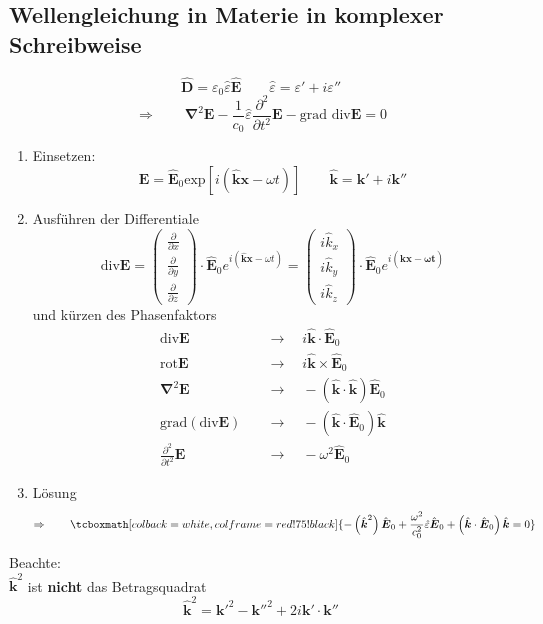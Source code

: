 \documentclass[titlepage,11pt,a4paper,ngerman]{report}
\newcommand{\tx}[1]{\textrm{#1}}
\newcommand{\prt}[2]{\frac{\partial #1}{\partial #2}}
\renewcommand{\vec}[1]{\boldsymbol{#1}}
\renewcommand{\epsilon}{\varepsilon}
\newcommand{\vabla}{\boldsymbol{\nabla}}
\newcommand{\rmbox}[1]{\tcboxmath[colback=white,colframe=red!75!black]{#1}}
\begin{document}
\subsection{Wellengleichung in Materie in komplexer Schreibweise}
\begin{equation*}
\hat{\vec{D}} = \epsilon_0 \hat{\epsilon} \hat{\vec{E}} \qquad \hat{\epsilon} = \epsilon' + i \epsilon''
\end{equation*}
\begin{equation*}
\Rightarrow \qquad \vabla^2 \vec{E} - \frac{1}{c_0} \hat{\epsilon} \prt{^2}{t^2} \vec{E} - \tx{grad div} \vec{E} = 0
\end{equation*}
\begin{enumerate}[(1)]
	\item Einsetzen:
	\begin{equation*}
	\vec{E} = \hat{\vec{E}}_0 \tx{exp} \left[i (\hat{\vec{k}} \vec{x} - \omega t)\right] \qquad \hat{\vec{k}} = \vec{k}' + i \vec{k}''
	\end{equation*}
	\item Ausführen der Differentiale
	\begin{equation*}
	\tx{div} \vec{E} = \begin{pmatrix}
	\prt{}{x} \\ \prt{}{y} \\ \prt{}{z}
	\end{pmatrix} \cdot \hat{\vec{E}}_0 e^{i(\hat{\vec{k}} \vec{x} - \omega t)} = \begin{pmatrix}
	i \hat{k}_x \\ i \hat{k}_y \\ i \hat{k}_z
	\end{pmatrix} \cdot \hat{\vec{E}}_0 e^{i(\hat{\vec{k}} \vec{x - \omega t})} 
	\end{equation*}
	und kürzen des Phasenfaktors
	\begin{align*}
	\tx{div} \vec{E} \quad &\rightarrow \quad i \hat{\vec{k}} \cdot \hat{\vec{E}}_0 \\
	\tx{rot} \vec{E} \quad &\rightarrow \quad i \hat{\vec{k}} \times \hat{\vec{E}}_0 \\
	\vabla^2 \vec{E} \quad &\rightarrow \quad - \left(\hat{\vec{k}} \cdot \hat{\vec{k}}\right) \hat{\vec{E}}_0 \\
	\tx{grad} (\tx{div} \vec{E}) \quad &\rightarrow \quad - \left(\hat{\vec{k}} \cdot \hat{\vec{E}}_0\right) \hat{\vec{k}}\\
	\prt{^2}{t^2} \vec{E} \quad &\rightarrow \quad - \omega^2 \hat{\vec{E}}_0
	\end{align*}
	\item Lösung
	\begin{equation*}
	\Rightarrow \qquad \rmbox{- \left(\hat{\vec{k}}^2\right) \hat{\vec{E}}_0 + \frac{\omega^2}{c_0^2} \hat{\epsilon} \hat{\vec{E}}_0 + \left(\hat{\vec{k}} \cdot \hat{\vec{E}}_0\right) \hat{\vec{k}} = 0 }
	\end{equation*}
\end{enumerate}
Beachte:\\
$ \hat{\vec{k}}^2 $ ist \textbf{nicht} das Betragsquadrat
\begin{equation*}
\hat{\vec{k}}^2 = \vec{k}'^2 - \vec{k}''^2 + 2 i \vec{k}' \cdot \vec{k}''
\end{equation*}
\end{document}

